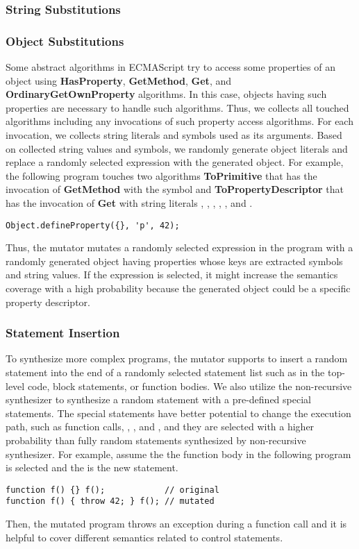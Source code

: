 \subsubsection{String Substitutions}


\subsubsection{Object Substitutions}
Some abstract algorithms in ECMAScript try to access some properties of an
object using \textbf{HasProperty}, \textbf{GetMethod}, \textbf{Get}, and
\textbf{OrdinaryGetOwnProperty} algorithms.  In this case, objects having such
properties are necessary to handle such algorithms.  Thus, we collects all
touched algorithms including any invocations of such property access algorithms.
For each invocation, we collects string literals and symbols used as its
arguments.  Based on collected string values and symbols, we randomly generate
object literals and replace a randomly selected expression with the generated
object.  For example, the following program touches two algorithms
\textbf{ToPrimitive} that has the invocation of \textbf{GetMethod} with the
symbol  and \textbf{ToPropertyDescriptor} that has the
invocation of \textbf{Get} with string literals , ,
, , , and
.
\begin{lstlisting}[style=myJSstyle]
Object.defineProperty({}, 'p', 42);
\end{lstlisting}
Thus, the mutator mutates a randomly selected expression in the program with a
randomly generated object having properties whose keys are extracted symbols and
string values.  If the expression  is selected, it might increase the
semantics coverage with a high probability because the generated object could be
a specific property descriptor.


\subsubsection{Statement Insertion}
To synthesize more complex programs, the mutator supports to insert a random
statement into the end of a randomly selected statement list such as in
the top-level code, block statements, or function bodies.  We also utilize the
non-recursive synthesizer to synthesize a random statement with a pre-defined
special statements.  The special statements have better potential to change the
execution path, such as function calls, , , and
, and they are selected with a higher probability than fully random
statements synthesized by non-recursive synthesizer.  For example, assume the
the function body in the following program is selected and the 
is the new statement.
\begin{lstlisting}[style=myJSstyle]
function f() {} f();            // original
function f() { throw 42; } f(); // mutated
\end{lstlisting}
Then, the mutated program throws an exception during a function call and it is
helpful to cover different semantics related to control statements.
